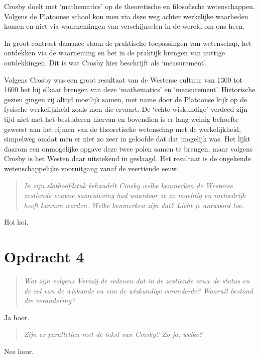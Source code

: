 \documentclass[a4paper,11pt]{article}
\begin{document}
Crosby doelt met `mathematics' op de theoretische en filosofische
wetenschappen. Volgens de Platoonse school kon men via deze weg achter
werkelijke waarheden komen en niet via waarnemingen van verschijnselen in de
wereld om ons heen.

In groot contrast daarmee staan de praktische toepassingen van wetenschap, het
ontdekken via de waarneming en het in de praktijk brengen van nuttige
ontdekkingen. Dit is wat Crosby hier beschrijft als `measurement'.

Volgens Crosby was een groot resultaat van de Westerse cultuur van 1300 tot
1600 het bij elkaar brengen van deze `mathematics' en
`measurement'. Historische gezien gingen zij altijd moeilijk samen, met name
door de Platoonse kijk op de fysische werkelijkheid zoals men die ervaart. De
`echte wiskundige' verdeed zijn tijd niet met het bestuderen hiervan en
bovendien is er lang weinig behoefte geweest aan het rijmen van de
theoretische wetenschap met de werkelijkheid, simpelweg omdat men er niet zo
zeer in geloofde dat dat mogelijk was. Het lijkt daarom een onmogelijke opgave
deze twee polen samen te brengen, maar volgens Crosby is het Westen daar
uitstekend in geslaagd. Het resultaat is de ongekende wetenschappelijke
vooruitgang vanaf de veertiende eeuw.


\begin{quote}
\emph{In zijn slothoofdstuk behandelt Crosby welke kenmerken de Westerse
  zestiende eeuwse samenleving had waardoor ze zo machtig en invloedrijk heeft
  kunnen worden. Welke kenmerken zijn dat? Licht je antwoord toe.}
\end{quote}

Hoi hoi.


\section*{Opdracht 4}


\begin{quote}
\emph{Wat zijn volgens Vermij de redenen dat in de zestiende eeuw de status en
  de rol van de wiskunde en van de wiskundige veranderde? Waaruit bestond die
  verandering?}
\end{quote}


Ja hoor.


\begin{quote}
\emph{Zijn er parallellen met de tekst van Crosby? Zo ja, welke?}
\end{quote}


Nee hoor.
\end{document}
